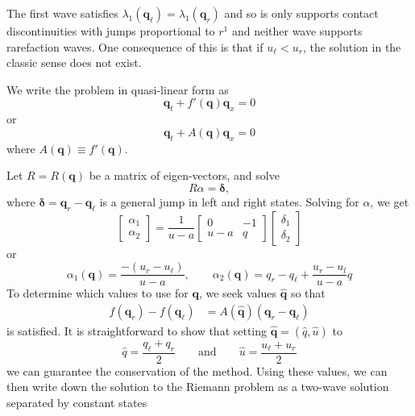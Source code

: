 \documentclass{article}
\begin{document}
The first wave satisfies $\lambda_1(\mathbf q_\ell) = \lambda_1(\mathbf q_r)$ and so is only supports contact discontinuities with jumps proportional to $r^1$ and neither wave supports rarefaction
waves.  One consequence of this is that if $u_\ell < u_r$, the solution in the classic sense does not exist. 

We write the problem in quasi-linear form as 
\begin{equation}
\mathbf q_t + f'(\mathbf q) \mathbf q_x = 0
\end{equation}
or
\begin{equation}
\mathbf q_t + A(\mathbf q) \mathbf q_x = 0
\end{equation}
where $A(\mathbf q) \equiv f'(\mathbf q)$.  

Let $R = R(\mathbf q)$ be a matrix of eigen-vectors, and solve
\begin{equation}
R \alpha = \mathbf \delta,
\end{equation}
where  $\mathbf \delta = \mathbf q_r - \mathbf q_\ell$ is a general jump in
left and right states.  Solving for $\alpha$, we get 
\begin{equation}
\left[\begin{array}{c} \alpha_1 \\ \alpha_2 \end{array}\right] = \frac{1}{u-a}
\left[
\begin{array}{rr}
0 & -1 \\ u-a & q
\end{array}
\right]
\left[
\begin{array}{r}
\delta_1 \\ \delta_2
\end{array}
\right]
\end{equation}
or 
\begin{equation}
\alpha_1(\mathbf q) = \frac{-(u_r - u_\ell)}{u-a}, \qquad 
\alpha_2(\mathbf q) = q_r - q_\ell + \frac{u_r - u_l}{u-a} q
\end{equation}
To determine which values to use for $\mathbf q$, we seek values $\widehat{\mathbf q}$ 
so that 
\begin{align}
f(\mathbf q_r) - f(\mathbf q_\ell) & = A(\widehat{\mathbf q})(\mathbf q_r - \mathbf q_\ell) 
\end{align}
is satisfied.  It is straightforward to show that 
setting $\widehat{\mathbf q} = (\widehat{q},\widehat{u})$ to
\begin{equation}
\widehat{q} = \frac{q_\ell + q_r}{2} 
\qquad \mbox{and} \qquad
\widehat{u} = \frac{u_\ell + u_r}{2}
\end{equation}
we can guarantee the conservation of the method.
Using these values, we can then write
down the solution to the Riemann problem as a two-wave
solution separated by constant states
\end{document}

